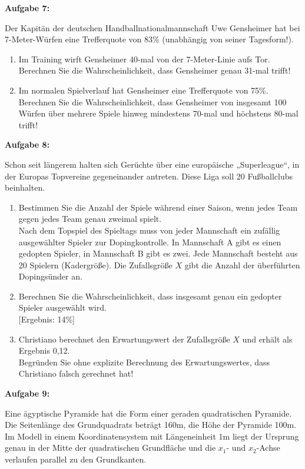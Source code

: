 \documentclass[a4paper,12pt]{article}
\newcommand{\Aufgabe}[1]{
  {
  \vspace*{0.5cm}
  \textsf{\textbf{Aufgabe #1}}
  \vspace*{0.2cm}
  
  }
}
\begin{document}
\Aufgabe{7:}
Der Kapitän der deutschen Handballnationalmannschaft Uwe Gensheimer hat bei 7-Meter-Würfen eine Trefferquote von 83\% (unabhängig von seiner Tagesform!).
\begin{enumerate}[label={\alph*)}]
  \item Im Training wirft Gensheimer 40-mal von der 7-Meter-Linie aufs Tor.\\
    Berechnen Sie die Wahrscheinlichkeit, dass Gensheimer genau 31-mal trifft!
  \item Im normalen Spielverlauf hat Gensheimer eine Trefferquote von 75\%.\\
    Berechnen Sie die Wahrscheinlichkeit, dass Gensheimer von insgesamt 100 Würfen über mehrere Spiele hinweg mindestens 70-mal und höchstens 80-mal trifft!
\end{enumerate}


\Aufgabe{8:}
Schon seit längerem halten sich Gerüchte über eine europäische „Superleague“, in der Europas Topvereine gegeneinander antreten. Diese Liga soll 20 Fußballclubs beinhalten.
\begin{enumerate}[label={\alph*)}]
  \item Bestimmen Sie die Anzahl der Spiele während einer Saison, wenn jedes Team gegen jedes Team genau zweimal spielt.\\

Nach dem Topspiel des Spieltags muss von jeder Mannschaft ein zufällig ausgewählter Spieler zur Dopingkontrolle. In Mannschaft A gibt es einen gedopten Spieler, in Mannschaft B gibt es zwei. Jede Mannschaft besteht aus 20 Spielern (Kadergröße). Die Zufallsgröße $X$  gibt die Anzahl der überführten Dopingsünder an.
  \item Berechnen Sie die Wahrscheinlichkeit, dass insgesamt genau ein gedopter Spieler ausgewählt wird.\\
    {[Ergebnis: 14\%]}
    \item Christiano berechnet den Erwartungswert der Zufallsgröße $X$ und erhält als Ergebnis 0,12.\\
Begründen Sie ohne explizite Berechnung des Erwartungswertes, dass Christiano falsch gerechnet hat!
\end{enumerate}


\Aufgabe{9:}
Eine ägyptische Pyramide hat die Form einer geraden quadratischen Pyramide. Die Seitenlänge des Grundquadrats beträgt 160m, die Höhe der Pyramide 100m. Im Modell in einem Koordinatensystem mit Längeneinheit 1m liegt der Ursprung genau in der Mitte der quadratischen Grundfläche und die $x_1$- und $x_2$-Achse verlaufen parallel zu den Grundkanten. 
\end{document}
